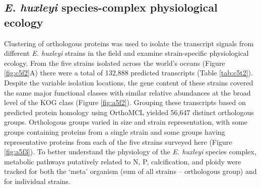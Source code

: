 \begin{figure}[h!]
\end{figure}



\subsection{\textit{E. huxleyi} species-complex physiological ecology}

Clustering of orthologous proteins was used to isolate the transcript signals from different \textit{E. huxleyi} strains in the field and examine strain-specific physiological ecology. From the five strains isolated across the world's oceans (Figure \ref{fig:c5f2}A) there were a total of 132,888 predicted transcripts (Table \ref{tab:c5t2}). Despite the variable isolation locations, the gene content of these strains covered the same major functional classes with similar relative abundances at the broad level of the KOG class (Figure \ref{fig:a5f2}). Grouping these transcripts based on predicted protein homology using OrthoMCL \citep{Li2003} yielded 56,647 distinct orthologous groups. Orthologous groups varied in size and strain representation, with some groups containing proteins from a single strain and some groups having representative proteins from each of the five strains surveyed here (Figure \ref{fig:a5f3}). To better understand the physiology of the \textit{E. huxleyi} species complex, metabolic pathways putatively related to N, P, calcification, and ploidy were tracked for both the `meta' organism (sum of all strains -- orthologous group) and for individual strains. \par

